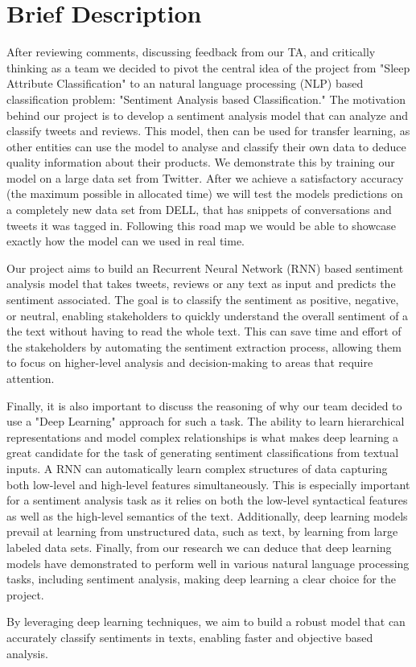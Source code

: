 \section{Brief Description}

After reviewing comments, discussing feedback from our TA, and critically thinking as a team we decided to pivot the central idea of the project from "Sleep Attribute Classification" to an natural language processing (NLP) based classification problem: "Sentiment Analysis based Classification." The motivation behind our project is to develop a sentiment analysis model that can analyze and classify tweets and reviews. This model, then can be used for transfer learning, as other entities can use the model to analyse and classify their own data to deduce quality information about their products. We demonstrate this by training our model on a large data set from Twitter. After we achieve a satisfactory accuracy (the maximum possible in allocated time) we will test the models predictions on a completely new data set from DELL, that has snippets of conversations and tweets it was tagged in. Following this road map we would be able to showcase exactly how the model can we used in real time.

Our project aims to build an Recurrent Neural Network (RNN) based sentiment analysis model that takes tweets, reviews or any text as input and predicts the sentiment associated. The goal is to classify the sentiment as positive, negative, or neutral, enabling stakeholders to quickly understand the overall sentiment of a the text without having to read the whole text. This can save time and effort of the stakeholders by automating the sentiment extraction process, allowing them to focus on higher-level analysis and decision-making to areas that require attention.

Finally, it is also important to discuss the reasoning of why our team decided to use a "Deep Learning" approach for such a task. The ability to learn hierarchical representations and model complex relationships is what makes deep learning a great candidate for the task of generating sentiment classifications from textual inputs. A RNN can automatically learn complex structures of data capturing both low-level and high-level features simultaneously. This is especially important for a sentiment analysis task as it relies on both the low-level syntactical features as well as the high-level semantics of the text. Additionally, deep learning models prevail at learning from unstructured data, such as text, by learning from large labeled data sets. Finally, from our research we can deduce that deep learning models have demonstrated to perform well in various natural language processing tasks, including sentiment analysis, making deep learning a clear choice for the project.

By leveraging deep learning techniques, we aim to build a robust model that can accurately classify sentiments in texts, enabling faster and objective based analysis.
